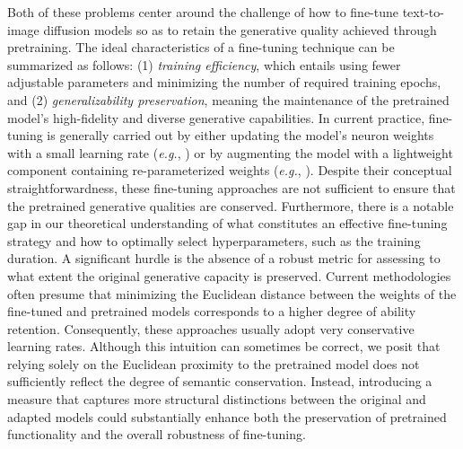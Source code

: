Both of these problems center around the challenge of how to fine-tune text-to-image diffusion models so as to retain the generative quality achieved through pretraining. The ideal characteristics of a fine-tuning technique can be summarized as follows: (1) \emph{training efficiency}, which entails using fewer adjustable parameters and minimizing the number of required training epochs, and (2) \emph{generalizability preservation}, meaning the maintenance of the pretrained model's high-fidelity and diverse generative capabilities. In current practice, fine-tuning is generally carried out by either updating the model’s neuron weights with a small learning rate (\emph{e.g.}, \cite{ruiz2023dreambooth}) or by augmenting the model with a lightweight component containing re-parameterized weights (\emph{e.g.}, \cite{hulora2022,zhang2023adding}). Despite their conceptual straightforwardness, these fine-tuning approaches are not sufficient to ensure that the pretrained generative qualities are conserved. Furthermore, there is a notable gap in our theoretical understanding of what constitutes an effective fine-tuning strategy and how to optimally select hyperparameters, such as the training duration. A significant hurdle is the absence of a robust metric for assessing to what extent the original generative capacity is preserved. Current methodologies often presume that minimizing the Euclidean distance between the weights of the fine-tuned and pretrained models corresponds to a higher degree of ability retention. Consequently, these approaches usually adopt very conservative learning rates. Although this intuition can sometimes be correct, we posit that relying solely on the Euclidean proximity to the pretrained model does not sufficiently reflect the degree of semantic conservation. Instead, introducing a measure that captures more structural distinctions between the original and adapted models could substantially enhance both the preservation of pretrained functionality and the overall robustness of fine-tuning.

